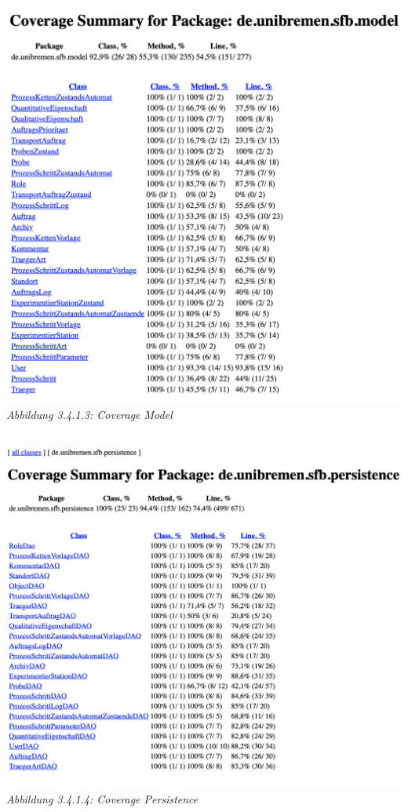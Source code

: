 \documentclass[enabledeprecatedfontcommands,fontsize=12pt,paper=a4,twoside]{scrartcl}
\begin{document}
 \hypertarget{sc3.4.1.3}{
\includegraphics[width=1\textwidth]{Screenshots/model.png}
\textit{Abbildung 3.4.1.3: Coverage Model}
} \\
 \hypertarget{sc3.4.1.4}{
\includegraphics[width=1\textwidth]{Screenshots/persistence.png}
\textit{Abbildung 3.4.1.4: Coverage Persistence}
} \\
\end{document}
